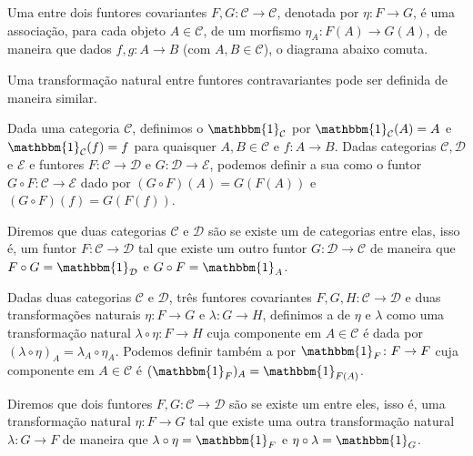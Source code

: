 Uma  entre dois funtores covariantes $F, G \colon \mathcal{C} \to \mathcal{C}$, denotada por $\eta \colon F \to G$, é uma associação, para cada objeto $A \in \mathcal{C}$, de um morfismo $\eta_A \colon F(A) \to G(A)$, de maneira que dados $f, g \colon A \to B$ (com $A, B \in \mathcal{C}$), o diagrama abaixo comuta.
\begin{center}
\end{center}
Uma transformação natural entre funtores contravariantes pode ser definida de maneira similar.

Dada uma categoria $\mathcal{C}$, definimos o  $\mathbbm{1}_\mathcal{C}$ por $\mathbbm{1}_\mathcal{C}(A) = A$ e $\mathbbm{1}_\mathcal{C}(f) = f$ para quaisquer $A, B \in \mathcal{C}$ e $f \colon A \to B$. Dadas categorias $\mathcal{C}, \mathcal{D}$ e $\mathcal{E}$ e funtores $F \colon \mathcal{C} \to \mathcal{D}$ e $G \colon \mathcal{D} \to \mathcal{E}$, podemos definir a sua  como o funtor $G \circ F \colon \mathcal{C} \to \mathcal{E}$ dado por $(G \circ F)(A) = G(F(A))$ e $(G \circ F)(f) = G(F(f))$.

Diremos que duas categorias $\mathcal{C}$ e $\mathcal{D}$ são  se existe um  de categorias entre elas, isso é, um funtor $F \colon \mathcal{C} \to \mathcal{D}$ tal que existe um outro funtor $G \colon \mathcal{D} \to \mathcal{C}$ de maneira que $F \circ G = \mathbbm{1}_\mathcal{D}$ e $G \circ F = \mathbbm{1}_A$.

Dadas duas categorias $\mathcal{C}$ e $\mathcal{D}$, três funtores covariantes $F, G, H \colon \mathcal{C} \to \mathcal{D}$ e duas transformações naturais $\eta \colon F \to G$ e $\lambda \colon G \to H$, definimos a  de $\eta$ e $\lambda$ como uma transformação natural $\lambda \circ \eta \colon F \to H$ cuja componente em $A \in \mathcal{C}$ é dada por $(\lambda \circ \eta)_A = \lambda_A \circ \eta_A$. Podemos definir também a  por $\mathbbm{1}_F \colon F \to F$ cuja componente em $A \in \mathcal{C}$ é $(\mathbbm{1}_F)_A = \mathbbm{1}_{F(A)}$.

Diremos que dois funtores $F, G \colon \mathcal{C} \to \mathcal{D}$ são  se existe um  entre eles, isso é, uma transformação natural $\eta \colon F \to G$ tal que existe uma outra transformação natural $\lambda \colon G \to F$ de maneira que $\lambda \circ \eta = \mathbbm{1}_F$ e $\eta \circ \lambda = \mathbbm{1}_G$.

